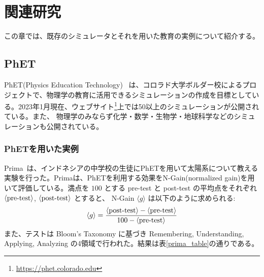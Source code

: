 \chapter{関連研究} \label{related}

この章では、既存のシミュレータとそれを用いた教育の実例について紹介する。

\section{PhET}

PhET(Physics Education Technology)~\cite{perkins_phet_2006} は、コロラド大学ボルダー校によるプロジェクトで、物理学の教育に活用できるシミュレーションの作成を目標としている。2023年1月現在、ウェブサイト\footnote{\url{https://phet.colorado.edu}}上では50以上のシミュレーションが公開されている。また、
物理学のみならず化学・数学・生物学・地球科学などのシミュレーションも公開されている。



\subsection{PhETを用いた実例}

Prima~\cite{prima_learning_2018}は、インドネシアの中学校の生徒にPhETを用いて太陽系について教える実験を行った。Primaは、PhETを利用する効果をN-Gain(normalized gain)を用いて評価している。満点を $100$ とする pre-test と post-test の平均点をそれぞれ $\langle \textrm{pre\\-test} \rangle$, $\langle \textrm{post\\-test} \rangle$ とすると、 N-Gain $\langle g \rangle$ は以下のように求められる:
$$ \langle g \rangle = \dfrac{\langle \textrm{post\\-test} \rangle - \langle \textrm{pre\\-test} \rangle}{100 - \langle \textrm{pre\\-test} \rangle} $$
また、テストは Bloom's Taxonomy に基づき Remembering, Understanding, Applying, Analyzing の4領域で行われた。結果は表\ref{prima_table}の通りである。

